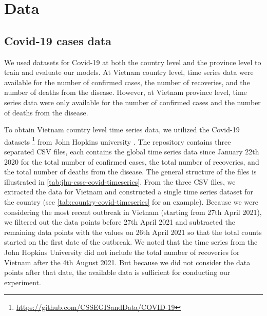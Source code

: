 \section{Data}
\label{sec:methodologies-data}

\subsection{Covid-19 cases data}
\label{sec:methodologies-data-covid19-cases}

We used datasets for Covid-19 at both the country level and the province level to train and evaluate our models.
At Vietnam country level, time series data were available for the number of confirmed cases, the number of recoveries, and the number of deaths from the disease.
However, at Vietnam province level, time series data were only available for the number of confirmed cases and the number of deaths from the disease.

To obtain Vietnam country level time series data, we utilized the Covid-19 datasets \footnote{\url{https://github.com/CSSEGISandData/COVID-19}} from John Hopkins university \cite{dongInteractiveWebbasedDashboard2020}.
The repository contains three separated \gls{CSV} files, each contains the global time series data since January 22th 2020 for the total number of confirmed cases, the total number of recoveries, and the total number of deaths from the disease.
The general structure of the files is illustrated in \autoref{tab:jhu-csse-covid-timeseries}.
From the three \gls{CSV} files, we extracted the data for Vietnam and constructed a single time series dataset for the country (see \autoref{tab:country-covid-timeseries} for an example).
Because we were considering the most recent outbreak in Vietnam (starting from 27th April 2021), we filtered out the data points before 27th April 2021 and subtracted the remaining data points with the values on 26th April 2021 so that the total counts started on the first date of the outbreak.
We noted that the time series from the John Hopkins University did not include the total number of recoveries for Vietnam after the 4th August 2021.
But because we did not consider the data points after that date, the available data is sufficient for conducting our experiment.

